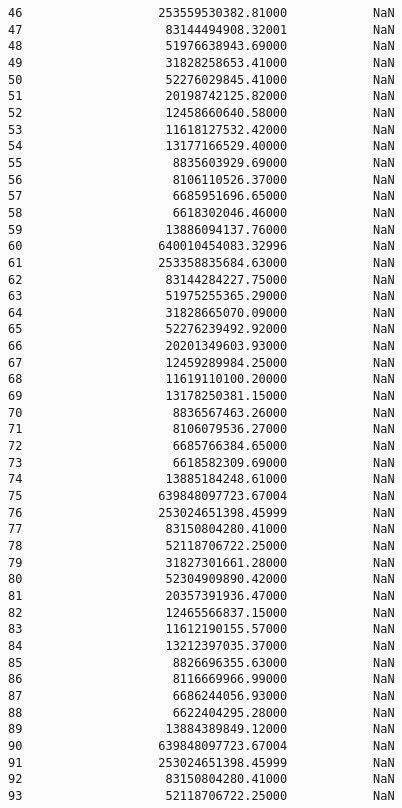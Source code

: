 \documentclass[11pt]{article}
\begin{document}
\begin{tcolorbox}[breakable, size=fbox, boxrule=.5pt, pad at break*=1mm, opacityfill=0]
\begin{Verbatim}[commandchars=\\\{\}]
46                   253559530382.81000            NaN
47                    83144494908.32001            NaN
48                    51976638943.69000            NaN
49                    31828258653.41000            NaN
50                    52276029845.41000            NaN
51                    20198742125.82000            NaN
52                    12458660640.58000            NaN
53                    11618127532.42000            NaN
54                    13177166529.40000            NaN
55                     8835603929.69000            NaN
56                     8106110526.37000            NaN
57                     6685951696.65000            NaN
58                     6618302046.46000            NaN
59                    13886094137.76000            NaN
60                   640010454083.32996            NaN
61                   253358835684.63000            NaN
62                    83144284227.75000            NaN
63                    51975255365.29000            NaN
64                    31828665070.09000            NaN
65                    52276239492.92000            NaN
66                    20201349603.93000            NaN
67                    12459289984.25000            NaN
68                    11619110100.20000            NaN
69                    13178250381.15000            NaN
70                     8836567463.26000            NaN
71                     8106079536.27000            NaN
72                     6685766384.65000            NaN
73                     6618582309.69000            NaN
74                    13885184248.61000            NaN
75                   639848097723.67004            NaN
76                   253024651398.45999            NaN
77                    83150804280.41000            NaN
78                    52118706722.25000            NaN
79                    31827301661.28000            NaN
80                    52304909890.42000            NaN
81                    20357391936.47000            NaN
82                    12465566837.15000            NaN
83                    11612190155.57000            NaN
84                    13212397035.37000            NaN
85                     8826696355.63000            NaN
86                     8116669966.99000            NaN
87                     6686244056.93000            NaN
88                     6622404295.28000            NaN
89                    13884389849.12000            NaN
90                   639848097723.67004            NaN
91                   253024651398.45999            NaN
92                    83150804280.41000            NaN
93                    52118706722.25000            NaN

\end{Verbatim}
\end{tcolorbox}
\end{document}
